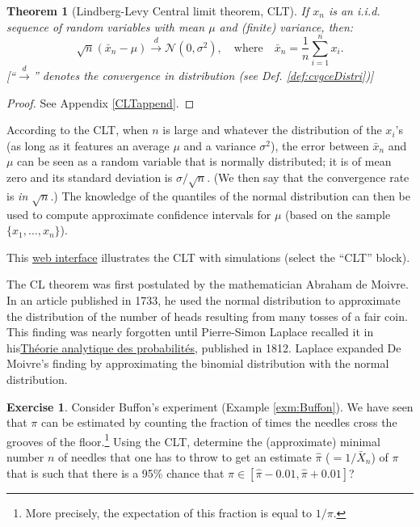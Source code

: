 \documentclass[
  12pt,
]{book}
\newtheorem{theorem}{Theorem}[chapter]
\theoremstyle{definition}
\theoremstyle{definition}
\theoremstyle{definition}
\newtheorem{exercise}{Exercise}[chapter]
\theoremstyle{definition}
\theoremstyle{remark}
\begin{document}
\begin{theorem}[Lindberg-Levy Central limit theorem, CLT]
\protect\hypertarget{thm:LindbergLevyCLT}{}\label{thm:LindbergLevyCLT}If \(x_n\) is an i.i.d. sequence of random variables with mean \(\mu\) and (finite) variance, then:
\[
\boxed{\sqrt{n} (\bar{x}_n - \mu) \overset{d}{\rightarrow} \mathcal{N}(0,\sigma^2), \quad \mbox{where} \quad \bar{x}_n = \frac{1}{n} \sum_{i=1}^{n} x_i.}
\]
{[}``\(\overset{d}{\rightarrow}\)'' denotes the convergence in distribution (see Def. \ref{def:cvgceDistri}){]}
\end{theorem}

\begin{proof}
See Appendix \ref{CLTappend}.
\end{proof}

According to the CLT, when \(n\) is large and whatever the distribution of the \(x_i\)'s (as long as it features an average \(\mu\) and a variance \(\sigma^2\)), the error between \(\bar{x}_n\) and \(\mu\) can be seen as a random variable that is normally distributed; it is of mean zero and its standard deviation is \(\sigma/\sqrt{n}\). (We then say that the convergence rate is \emph{in \(\sqrt{n}\)}.) The knowledge of the quantiles of the normal distribution can then be used to compute approximate confidence intervals for \(\mu\) (based on the sample \(\{x_1,\dots,x_n\}\)).

This \href{https://jrenne.shinyapps.io/StatEcoII/}{web interface} illustrates the CLT with simulations (select the ``CLT'' block).

The CL theorem was first postulated by the mathematician Abraham de Moivre. In an article published in 1733, he used the normal distribution to approximate the distribution of the number of heads resulting from many tosses of a fair coin. This finding was nearly forgotten until Pierre-Simon Laplace recalled it in his\href{https://archive.org/details/thorieanalytiqu01laplgoog}{Théorie analytique des probabilités}, published in 1812. Laplace expanded De Moivre's finding by approximating the binomial distribution with the normal distribution.

\begin{exercise}
\protect\hypertarget{exr:ExoBuffon}{}\label{exr:ExoBuffon}Consider Buffon's experiment (Example \ref{exm:Buffon}). We have seen that \(\pi\) can be estimated by counting the fraction of times the needles cross the grooves of the floor.\footnote{More precisely, the expectation of this fraction is equal to \(1/\pi\).} Using the CLT, determine the (approximate) minimal number \(n\) of needles that one has to throw to get an estimate \(\hat\pi\) (\(= 1/\bar{X}_n\)) of \(\pi\) that is such that there is a 95\% chance that \(\pi \in [\hat\pi-0.01,\hat\pi+0.01]\)?
\end{exercise}
\end{document}
